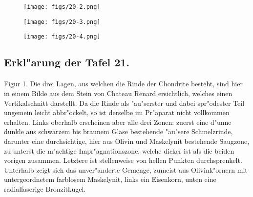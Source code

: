 \documentclass[a4paper, 11pt, oneside, polutonikogreek, german]{article}
\begin{document}
\vspace*{\fill}
\begin{figure}[H]
\centering
\texttt{[image: figs/20-2.png]}
\caption{}
\end{figure}
\vspace*{\fill}
\clearpage

\vspace*{\fill}
\begin{figure}[H]
\centering
\texttt{[image: figs/20-3.png]}
\caption{}
\end{figure}
\vspace*{\fill}
\clearpage

\vspace*{\fill}
\begin{figure}[H]
\centering
\texttt{[image: figs/20-4.png]}
\caption{}
\end{figure}
\vspace*{\fill}
\clearpage

\subsection{Erkl"arung der Tafel 21.}
\paragraph{}
Figur 1. Die drei Lagen, aus welchen die Rinde der Chondrite besteht, sind hier in einem Bilde aus dem Stein von Chateau Renard ersichtlich, welches einen Vertikalschnitt darstellt. Da die Rinde als "au"serster und dabei spr"odester Teil ungemein leicht abbr"ockelt, so ist derselbe im Pr"aparat nicht vollkommen erhalten. Links oberhalb erscheinen aber alle drei Zonen: zuerst eine d"unne dunkle aus schwarzem bis braunem Glase bestehende "au"sere Schmelzrinde, darunter eine durchsichtige, hier aus Olivin und Maskelynit bestehende Saugzone, zu unterst die m"achtige Impr"agnationszone, welche dicker ist als die beiden vorigen zusammen. Letztere ist stellenweise von hellen Punkten durchsprenkelt. Unterhalb zeigt sich das unver"anderte Gemenge, zumeist aus Olivink"ornern mit untergeordnetem farblosem Maskelynit, links ein Eisenkorn, unten eine radialfaserige Bronzitkugel.
\end{document}
